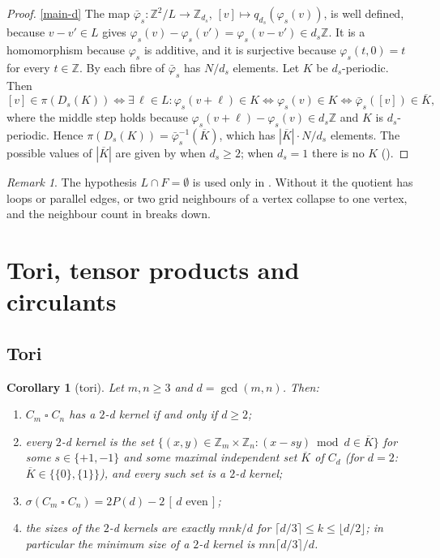 \documentclass[11pt]{article}
\theoremstyle{plain}
\newtheorem{corollary}[corollary]{Corollary}
\theoremstyle{definition}
\theoremstyle{remark}
\newtheorem{remark}[remark]{Remark}
\newcommand{\Z}{\mathbb{Z}}
\newcommand{\T}{\mathbin{\square}}
\newcommand{\Dg}[2]{D_{#1}(#2)}
\newcommand{\Per}{P}
\newcommand{\Iv}[1]{[\,#1\,]}
\begin{document}
\begin{proof}
\ref{main-d} The map $\bar\varphi_s : \Z^2/L \to \Z_{d_s}$, $[v] \mapsto q_{d_s}(\varphi_s(v))$,
is well defined, because $v - v' \in L$ gives
$\varphi_s(v) - \varphi_s(v') = \varphi_s(v - v') \in d_s\Z$. It is a homomorphism because
$\varphi_s$ is additive, and it is surjective because $\varphi_s(t, 0) = t$ for every
$t \in \Z$. By  each fibre of $\bar\varphi_s$ has $N/d_s$ elements.
Let $K$ be $d_s$-periodic. Then
\[
[v] \in \pi(\Dg{s}{K}) \iff \exists\, \ell \in L : \varphi_s(v + \ell) \in K
\iff \varphi_s(v) \in K \iff \bar\varphi_s([v]) \in \overline{K},
\]
where the middle step holds because $\varphi_s(v + \ell) - \varphi_s(v) \in d_s\Z$ and $K$ is
$d_s$-periodic. Hence $\pi(\Dg{s}{K}) = \bar\varphi_s^{-1}(\overline{K})$, which has
$|\overline{K}| \cdot N/d_s$ elements. The possible values of $|\overline{K}|$ are given by
 when $d_s \ge 2$; when $d_s = 1$ there is no $K$ ().
\end{proof}

\begin{remark}
The hypothesis $L \cap F = \emptyset$ is used only in . Without it the
quotient has loops or parallel edges, or two grid neighbours of a vertex collapse to one
vertex, and the neighbour count in  breaks down.
\end{remark}

\section{Tori, tensor products and circulants}\label{sec:corollaries}

\subsection{Tori}

\begin{corollary}[tori]\label{cor:torus}
Let $m, n \ge 3$ and $d = \gcd(m,n)$. Then:
\begin{enumerate}[label=(\alph*)]
  \item $C_m \T C_n$ has a $2$-d kernel if and only if $d \ge 2$;
  \item every $2$-d kernel is the set
        $\{(x, y) \in \Z_m \times \Z_n : (x - sy) \bmod d \in \overline{K}\}$ for some
        $s \in \{+1, -1\}$ and some maximal independent set $\overline{K}$ of $C_d$ (for
        $d = 2$: $\overline{K} \in \{\{0\}, \{1\}\}$), and every such set is a $2$-d kernel;
  \item $\sigma(C_m \T C_n) = 2\Per(d) - 2\,\Iv{d \text{ even}}$;
  \item the sizes of the $2$-d kernels are exactly $mnk/d$ for
        $\lceil d/3 \rceil \le k \le \lfloor d/2 \rfloor$; in particular the minimum size of a
        $2$-d kernel is $mn\lceil d/3 \rceil / d$.
\end{enumerate}
\end{corollary}
\end{document}
